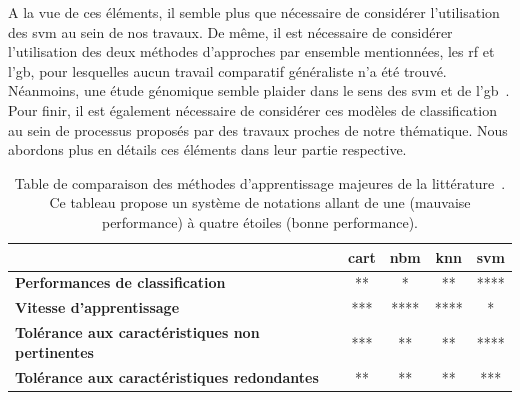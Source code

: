 A la vue de ces éléments, il semble plus que nécessaire de considérer l'utilisation des \gls{svm} au sein de nos travaux. De même, il est nécessaire de considérer l'utilisation des deux méthodes d'approches par ensemble mentionnées, les \gls{rf} et l'\gls{gb}, pour lesquelles aucun travail comparatif généraliste n'a été trouvé. Néanmoins, une étude génomique semble plaider dans le sens des \gls{svm} et de l'\gls{gb}~\cite{Ogutu2011}. Pour finir, il est également nécessaire de considérer ces modèles de classification au sein de processus proposés par des travaux proches de notre thématique. Nous abordons plus en détails ces éléments dans leur partie respective.\par

\begin{table}[H]
  \small
  \centering 
    \begin{tabular}{lcccc}
        \toprule
                                                                    & \textbf{\gls{cart}}   & \textbf{\gls{nbm}}& \textbf{\gls{knn}}    & \textbf{\gls{svm}}\\
        \midrule
        \textbf{Performances de classification}                     & **                    & *                 & **                    & ****              \\
        \midrule
        \textbf{Vitesse d'apprentissage}                            & ***                   & ****              & ****                  & *                 \\
        \midrule
        \textbf{Tolérance aux caractéristiques non pertinentes}     & ***                   & **                & **                    & ****              \\
        \midrule
        \textbf{Tolérance aux caractéristiques redondantes}         & **                    & **                & **                    & ***               \\
        \bottomrule
  \end{tabular}
  \caption{Table de comparaison des méthodes d'apprentissage majeures de la littérature~\cite{Kotsiantis2007}. Ce tableau propose un système de notations allant de une (mauvaise performance) à quatre étoiles (bonne performance).}
  \label{tab:model_comparison}
\end{table}
\clearpage

